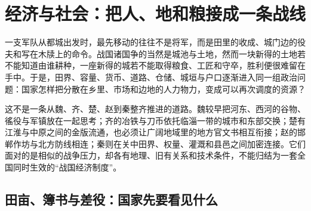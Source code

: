 \section{经济与社会：把人、地和粮接成一条战线}

一支军队从都城出发时，最先移动的往往不是将军，而是田里的收成、城门边的役夫和写在木牍上的命令。战国诸国争的当然是城池与土地，然而一块新得的土地若不能知道由谁耕种，一座新得的城若不能取得粮食、工匠和守卒，胜利便很难留在手中。于是，田界、容量、货币、道路、仓储、城垣与户口逐渐进入同一组政治问题：国家怎样把分散在乡里、市场和边地的人力物力，变成可以再次调度的资源？

这不是一条从魏、齐、楚、赵到秦整齐推进的道路。魏较早把河东、西河的谷物、徭役与军镇放在一起思考；齐的冶铁与刀币依托临淄一带的城市和东部交换；楚有江淮与中原之间的金版流通，也必须让广阔地域里的地方官文书相互衔接；赵的邯郸作坊与北方防线相连；秦则在关中田界、权量、灌溉和县邑之间加密连接。它们面对的是相似的战争压力，却各有地理、旧有关系和技术条件，不能归结为一套全国同时生效的“战国经济制度”。

\subsection{田亩、簿书与差役：国家先要看见什么}

